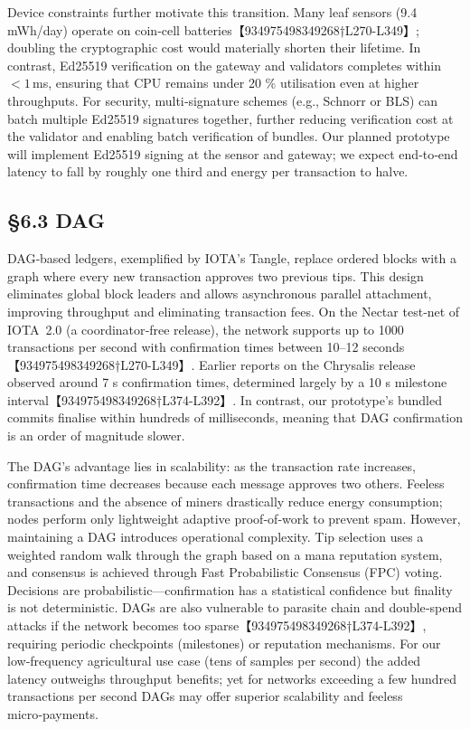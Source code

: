 Device constraints further motivate this transition.  Many leaf sensors (9.4 mWh/day) operate on coin‑cell batteries【934975498349268†L270-L349】; doubling the cryptographic cost would materially shorten their lifetime.  In contrast, Ed25519 verification on the gateway and validators completes within \(<\!1\,\)ms, ensuring that CPU remains under 20 \% utilisation even at higher throughputs.  For security, multi‑signature schemes (e.g., Schnorr or BLS) can batch multiple Ed25519 signatures together, further reducing verification cost at the validator and enabling batch verification of bundles.  Our planned prototype will implement Ed25519 signing at the sensor and gateway; we expect end‑to‑end latency to fall by roughly one third and energy per transaction to halve.

\subsection{\S6.3 DAG}
\label{subsec:dag-discussion}

DAG‑based ledgers, exemplified by IOTA’s Tangle, replace ordered blocks with a graph where every new transaction approves two previous tips.  This design eliminates global block leaders and allows asynchronous parallel attachment, improving throughput and eliminating transaction fees.  On the Nectar test‑net of IOTA~2.0 (a coordinator‑free release), the network supports up to 1000 transactions per second with confirmation times between 10–12 seconds【934975498349268†L270-L349】.  Earlier reports on the Chrysalis release observed around 7 s confirmation times, determined largely by a 10 s milestone interval【934975498349268†L374-L392】.  In contrast, our prototype’s bundled commits finalise within hundreds of milliseconds, meaning that DAG confirmation is an order of magnitude slower.

The DAG’s advantage lies in scalability: as the transaction rate increases, confirmation time decreases because each message approves two others.  Feeless transactions and the absence of miners drastically reduce energy consumption; nodes perform only lightweight adaptive proof‑of‑work to prevent spam.  However, maintaining a DAG introduces operational complexity.  Tip selection uses a weighted random walk through the graph based on a mana reputation system, and consensus is achieved through Fast Probabilistic Consensus (FPC) voting.  Decisions are probabilistic—confirmation has a statistical confidence but finality is not deterministic.  DAGs are also vulnerable to parasite chain and double‑spend attacks if the network becomes too sparse【934975498349268†L374-L392】, requiring periodic checkpoints (milestones) or reputation mechanisms.  For our low‑frequency agricultural use case (tens of samples per second) the added latency outweighs throughput benefits; yet for networks exceeding a few hundred transactions per second DAGs may offer superior scalability and feeless micro‑payments.

